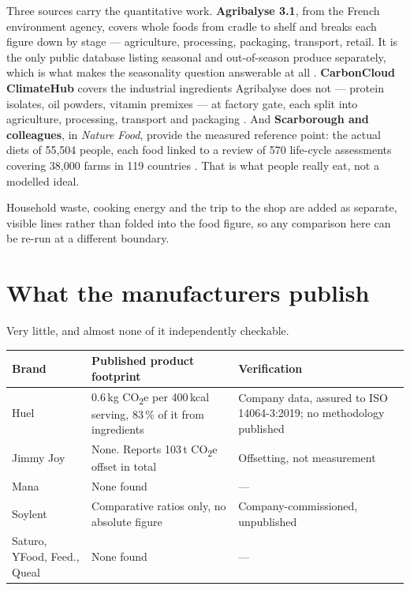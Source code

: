 \documentclass[11pt,a4paper]{article}
\newcommand{\co}{CO\textsubscript{2}e}
\begin{document}
Three sources carry the quantitative work. \textbf{Agribalyse 3.1}, from the French
environment agency, covers whole foods from cradle to shelf and breaks each figure
down by stage — agriculture, processing, packaging, transport, retail. It is the only
public database listing seasonal and out-of-season produce separately, which is what
makes the seasonality question answerable at all \cite{agribalyse}.
\textbf{CarbonCloud ClimateHub} covers the industrial ingredients Agribalyse does not
— protein isolates, oil powders, vitamin premixes — at factory gate, each split into
agriculture, processing, transport and packaging \cite{climatehub}. And
\textbf{Scarborough and colleagues}, in \emph{Nature Food}, provide the measured
reference point: the actual diets of 55,504 people, each food linked to a review of
570 life-cycle assessments covering 38,000 farms in 119 countries
\cite{scarborough}. That is what people really eat, not a modelled ideal.

Household waste, cooking energy and the trip to the shop are added as separate,
visible lines rather than folded into the food figure, so any comparison here can be
re-run at a different boundary.

\section{What the manufacturers publish}

Very little, and almost none of it independently checkable.

\begin{table}[h]
\centering
\footnotesize
\begin{tabularx}{\textwidth}{@{}lLL@{}}
\toprule
\textbf{Brand} & \textbf{Published product footprint} & \textbf{Verification} \\
\midrule
Huel & 0.6\,kg \co{} per 400\,kcal serving, 83\,\% of it from ingredients & Company data, assured to ISO 14064-3:2019; no methodology published \\
\addlinespace
Jimmy Joy & None. Reports 103\,t \co{} offset in total & Offsetting, not measurement \\
\addlinespace
Mana & None found & --- \\
\addlinespace
Soylent & Comparative ratios only, no absolute figure & Company-commissioned, unpublished \\
\addlinespace
Saturo, YFood, Feed., Queal & None found & --- \\
\bottomrule
\end{tabularx}
\end{table}
\end{document}
